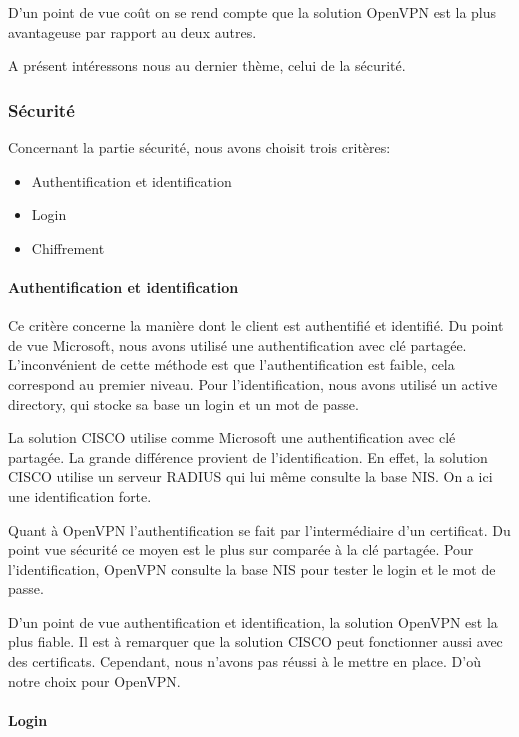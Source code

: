 D'un point de vue coût on se rend compte que la solution OpenVPN est la plus avantageuse par rapport au deux autres. 

A présent intéressons nous au dernier thème, celui de la sécurité.

\subsubsection{Sécurité}

Concernant la partie sécurité, nous avons choisit trois critères:
\begin{itemize}
 	\item Authentification et identification
	\item Login
	\item Chiffrement

\end{itemize}

\paragraph{Authentification et identification}

Ce critère concerne la manière dont le client est authentifié et identifié.
Du point de vue Microsoft, nous avons utilisé une authentification avec clé partagée. L'inconvénient de cette méthode est que l'authentification est faible, cela correspond au premier niveau. Pour l'identification, nous avons utilisé un active directory, qui stocke sa base un login et un mot de passe.

La solution CISCO utilise comme Microsoft une authentification avec clé partagée. La grande différence provient de l'identification. En effet, la solution CISCO utilise un serveur RADIUS qui lui même consulte la base NIS. On a ici une identification forte.

Quant à OpenVPN l'authentification se fait par l'intermédiaire d'un certificat. Du point vue sécurité ce moyen est le plus sur comparée à la clé partagée. Pour l'identification, OpenVPN consulte la base NIS pour tester le login et le mot de passe.


D'un point de vue authentification et identification, la solution OpenVPN est la plus fiable. Il est à remarquer que la solution CISCO peut fonctionner aussi avec des certificats. Cependant, nous n'avons pas réussi à le mettre en place. D'où notre choix pour OpenVPN.

\paragraph{Login}

